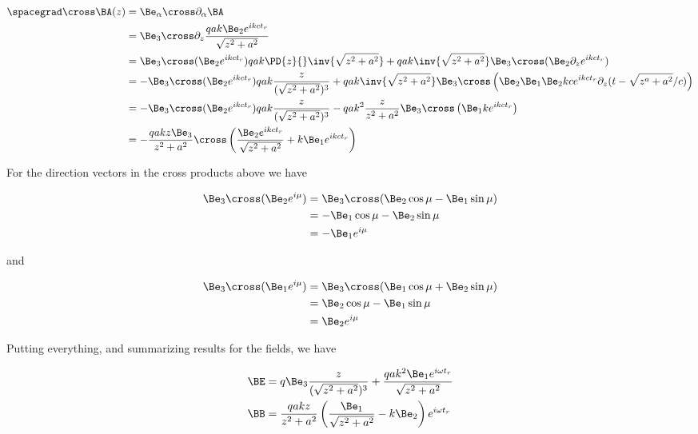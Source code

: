 \begin{align*}
\spacegrad \cross \BA(z)
&=
\Be_\alpha \cross \partial_\alpha \BA \\
&=
\Be_3 \cross \partial_z \frac{q a k \Be_2 e^{i k c t_r} }{\sqrt{z^2 + a^2}}  \\
&=
\Be_3 \cross (\Be_2 e^{i  k c t_r} ) q a  k \PD{z}{} \inv{\sqrt{z^2 + a^2}} 
+
q a  k \inv{\sqrt{z^2 + a^2}} \Be_3 \cross (\Be_2 \partial_z e^{i  k c t_r} ) \\
&=
-\Be_3 \cross (\Be_2 e^{i  k c t_r} ) q a  k \frac{z}{(\sqrt{z^2 + a^2})^3} 
+
q a  k \inv{\sqrt{z^2 + a^2}} \Be_3 \cross \left( \Be_2 \Be_1 \Be_2 k c e^{i  k c t_r} \partial_z ( t - \sqrt{z^a + a^2}/c ) \right) \\
&=
-\Be_3 \cross (\Be_2 e^{i  k c t_r} ) q a  k \frac{z}{(\sqrt{z^2 + a^2})^3} 
-
q a  k^2 \frac{z}{z^2 + a^2} \Be_3 \cross \left( \Be_1 k e^{i  k c t_r} \right) \\
&=
-\frac{q a k z \Be_3}{z^2 + a^2} \cross \left( 
\frac{ \Be_2 e^{i k c t_r} }{\sqrt{z^2 + a^2}} + k \Be_1 e^{i k c t_r} 
\right)
\end{align*}

For the direction vectors in the cross products above we have

\begin{align*}
\Be_3 \cross (\Be_2 e^{i \mu})
&=
\Be_3 \cross (\Be_2 \cos\mu - \Be_1 \sin\mu) \\
&=
-\Be_1 \cos\mu - \Be_2 \sin\mu \\
&=
-\Be_1 e^{i \mu}
\end{align*}

and

\begin{align*}
\Be_3 \cross (\Be_1 e^{i \mu})
&=
\Be_3 \cross (\Be_1 \cos\mu + \Be_2 \sin\mu) \\
&=
\Be_2 \cos\mu - \Be_1 \sin\mu \\
&=
\Be_2 e^{i \mu}
\end{align*}

Putting everything, and summarizing results for the fields, we have

\begin{align}\label{eqn:relativisticElectrodynamicsExamReflection:250}
\BE &= 
q \Be_3 \frac{z}{(\sqrt{z^2 + a^2})^3}
+
\frac{q a k^2 \Be_1 e^{i \omega t_r} }{\sqrt{z^2 + a^2}} \\
\BB 
&= \frac{q a k z}{ z^2 + a^2} \left( \frac{\Be_1}{\sqrt{z^2 + a^2}} - k \Be_2 \right) e^{i \omega t_r}
\end{align}

